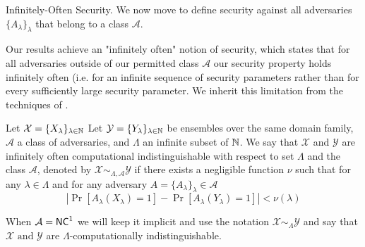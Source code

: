 \medskip
\noindent
{\sc Infinitely-Often Security.}
We now move to define security against all adversaries $\{A_\lambda\}_\lambda$ that belong to a class $\mathcal{A}$. 


Our results achieve an "infinitely often" notion of security, which states that for all adversaries outside of our permitted class $\mathcal{A}$ our security property holds infinitely often (i.e. for an infinite sequence of security parameters rather than for every sufficiently large security parameter. We 
inherit this limitation from the techniques of \cite{fgcrypto}. 

\begin{definition}
Let $\mathcal{X} = \{X_{\lambda}\}_{\lambda\in\mathbb{N}}$ Let $\mathcal{Y} = \{Y_{\lambda}\}_{\lambda\in\mathbb{N}}$ be ensembles over the same domain family, $\mathcal{A}$ a class of adversaries, and $\Lambda$ an infinite subset of $\mathbb{N}$. 
We say that $\mathcal{X}$ and $\mathcal{Y}$ are infinitely often computational indistinguishable with respect to set $\Lambda$ and the class $\mathcal{A}$,
denoted by
$\mathcal{X} \sim_{\Lambda,\mathcal{A}} \mathcal{Y}$
if there exists a negligible function $\nu$ such that for any $\lambda \in \Lambda$ and for any adversary $A=\{A_\lambda\}_\lambda \in \mathcal{A}$
\[
| \Pr[A_{\lambda}(X_{\lambda}) = 1] - \Pr[A_{\lambda}(Y_{\lambda}) = 1]| < \nu(\lambda)
\]
\end{definition}
When $\mathcal{A} = {\mathsf{NC}}^1$ we will keep it implicit and use the notation $\mathcal{X} \sim_{\Lambda} \mathcal{Y}$ and say that $\mathcal{X} \text{ and } \mathcal{Y}$ are $\Lambda$-computationally indistinguishable.




